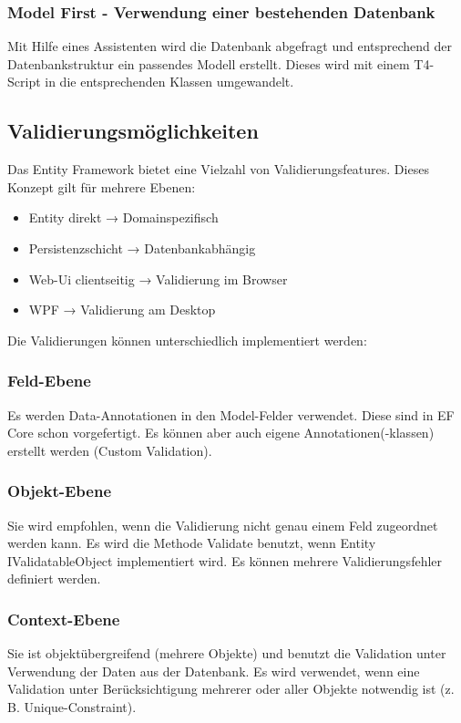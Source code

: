 \subsubsection{Model First - Verwendung einer bestehenden Datenbank}
Mit Hilfe eines Assistenten wird die Datenbank abgefragt und entsprechend der Datenbankstruktur ein passendes Modell erstellt.
Dieses wird mit einem T4-Script in die entsprechenden Klassen umgewandelt.

\subsection{Validierungsmöglichkeiten}
Das Entity Framework bietet eine Vielzahl von Validierungsfeatures. Dieses Konzept gilt für mehrere
Ebenen:

\begin{itemize}
    \item Entity direkt → Domainspezifisch
    \item Persistenzschicht → Datenbankabhängig
    \item Web-Ui clientseitig → Validierung im Browser
    \item WPF → Validierung am Desktop
\end{itemize}

Die Validierungen können unterschiedlich implementiert werden:

\subsubsection{Feld-Ebene}
Es werden Data-Annotationen in den Model-Felder verwendet. Diese sind in EF Core schon vorgefertigt. Es können aber auch eigene
Annotationen(-klassen) erstellt werden (Custom Validation).

\subsubsection{Objekt-Ebene}
Sie wird empfohlen, wenn die Validierung nicht genau einem Feld zugeordnet werden kann.
Es wird die Methode Validate benutzt, wenn Entity IValidatableObject implementiert wird. Es können
mehrere Validierungsfehler definiert werden.

\subsubsection{Context-Ebene}
Sie ist objektübergreifend (mehrere Objekte) und benutzt die Validation unter Verwendung
der Daten aus der Datenbank.
Es wird verwendet, wenn eine Validation unter Berücksichtigung mehrerer oder aller Objekte
notwendig ist (z. B. Unique-Constraint).

